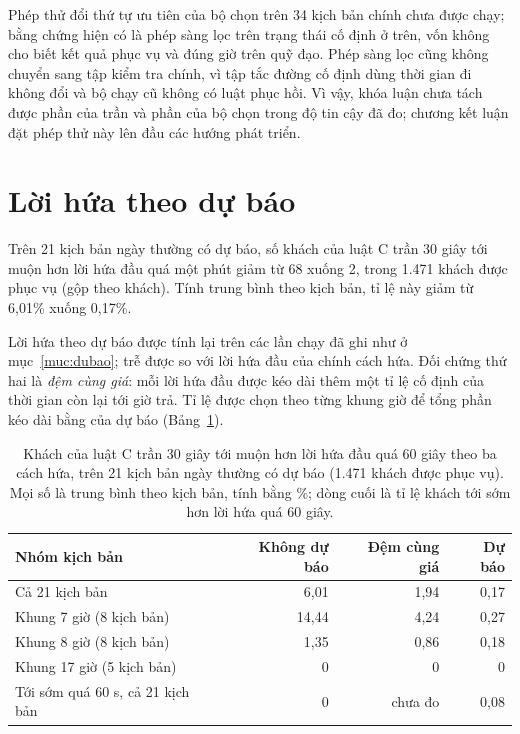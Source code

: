 Phép thử đổi thứ tự ưu tiên của bộ chọn trên 34 kịch bản chính chưa được chạy; bằng chứng hiện có là phép sàng
lọc trên trạng thái cố định ở trên, vốn không cho biết kết quả phục vụ và đúng giờ trên quỹ đạo. Phép sàng lọc
cũng không chuyển sang tập kiểm tra chính, vì tập tắc đường cố định dùng thời gian đi không đổi và bộ chạy cũ không
có luật phục hồi. Vì vậy, khóa luận chưa tách được phần của trần và phần của bộ chọn trong độ tin cậy đã đo; chương
kết luận đặt phép thử này lên đầu các hướng phát triển.

\section{Lời hứa theo dự báo}
\label{muc:c4-dubao}

Trên 21 kịch bản ngày thường có dự báo, số khách của luật C trần 30 giây tới muộn hơn lời hứa đầu quá một phút
giảm từ 68 xuống 2, trong 1.471 khách được phục vụ (gộp theo khách). Tính trung bình theo kịch bản, tỉ lệ này giảm
từ 6,01\% xuống 0,17\%.

Lời hứa theo dự báo được tính lại trên các lần chạy đã ghi như ở mục~\ref{muc:dubao}; trễ được so với lời hứa đầu
của chính cách hứa. Đối chứng thứ hai là \emph{đệm cùng giá}: mỗi lời hứa đầu được kéo dài thêm một tỉ lệ cố định
của thời gian còn lại tới giờ trả. Tỉ lệ được chọn theo từng khung giờ để tổng phần kéo dài bằng của dự báo
(Bảng~\ref{bang:c4-dubao}).

\begin{table}[htbp]
\centering
\caption{Khách của luật C trần 30 giây tới muộn hơn lời hứa đầu quá 60 giây theo ba cách hứa, trên 21 kịch bản
ngày thường có dự báo (1.471 khách được phục vụ). Mọi số là trung bình theo kịch bản, tính bằng \%; dòng cuối là
tỉ lệ khách tới sớm hơn lời hứa quá 60 giây.}
\label{bang:c4-dubao}
\small
\begin{tabular}{@{}lrrr@{}}
\toprule
\textbf{Nhóm kịch bản} & \textbf{Không dự báo} & \textbf{Đệm cùng giá} & \textbf{Dự báo}\\
\midrule
Cả 21 kịch bản & 6,01 & 1,94 & 0,17\\
Khung 7 giờ (8 kịch bản) & 14,44 & 4,24 & 0,27\\
Khung 8 giờ (8 kịch bản) & 1,35 & 0,86 & 0,18\\
Khung 17 giờ (5 kịch bản) & 0 & 0 & 0\\
\midrule
Tới sớm quá 60 s, cả 21 kịch bản & 0 & chưa đo & 0,08\\
\bottomrule
\end{tabular}
\end{table}

